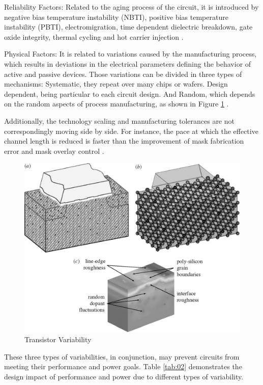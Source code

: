 \documentclass[ecp,tc, english]{iiufrgs}
\begin{document}
Reliability Factors: 
Related to the aging process of the circuit, it is introduced by negative bias temperature instability (NBTI), positive bias temperature instability (PBTI), electromigration, time dependent dielectric breakdown, gate oxide integrity, thermal cycling and hot carrier injection \cite{nassif:08}.
 
Physical Factors:
It is related to variations caused by the manufacturing process, which results in deviations in the electrical parameters defining the behavior of active and passive devices. Those variations can be divided in three types of mechanisms: Systematic, they repeat over many chips or wafers. Design dependent, being particular to each circuit design. And Random, which depends on the random aspects of process manufacturing, as shown in Figure \ref{fig:Fig2} \cite{nassif:08}.

Additionally, the technology scaling and manufacturing tolerances are not correspondingly moving side by side. For instance, the pace at which the effective channel length is reduced is faster than the improvement of mask fabrication error and mask overlay control \cite{nassif:08} \cite{aghababa2009static}.

\begin{figure}[H]
\centering
\includegraphics[width=.5\textwidth]{transistorVariability.jpg}
\caption{Transistor Variability}
\label{fig:Fig2}
\end{figure}

These three types of variabilities, in conjunction, may prevent circuits from meeting their performance and power goals. Table \ref{tab:02} demonstrates the design impact of performance and power due to different types of variability.
\end{document}

